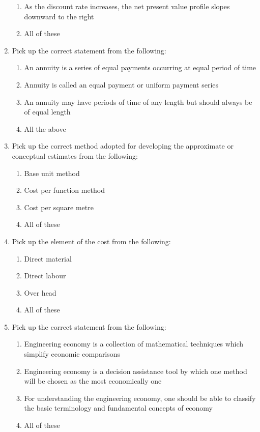 \documentclass[11pt,a4paper]{article}
\begin{document}
\begin{enumerate}
\begin{enumerate}[label=\Alph*.]
\item{As the discount rate increases, the net present value profile slopes downward to the right}
\item{All of these}
\end{enumerate}
\item{Pick up the correct statement from the following:}
\begin{enumerate}[label=\Alph*.]
\item{An annuity is a series of equal payments occurring at equal period of time}
\item{Annuity is called an equal payment or uniform payment series}
\item{An annuity may have periods of time of any length but should always be of equal length}
\item{All the above}
\end{enumerate}
\item{Pick up the correct method adopted for developing the approximate or conceptual estimates from the following:}
\begin{enumerate}[label=\Alph*.]
\item{Base unit method}
\item{Cost per function method}
\item{Cost per square metre}
\item{All of these}
\end{enumerate}
\item{Pick up the element of the cost from the following:}
\begin{enumerate}[label=\Alph*.]
\item{Direct material}
\item{Direct labour}
\item{Over head}
\item{All of these}
\end{enumerate}
\item{Pick up the correct statement from the following:}
\begin{enumerate}[label=\Alph*.]
\item{Engineering economy is a collection of mathematical techniques which simplify economic comparisons}
\item{Engineering economy is a decision assistance tool by which one method will be chosen as the most economically one}
\item{For understanding the engineering economy, one should be able to classify the basic terminology and fundamental concepts of economy}
\item{All of these}

\end{enumerate}
\end{enumerate}
\end{document}
